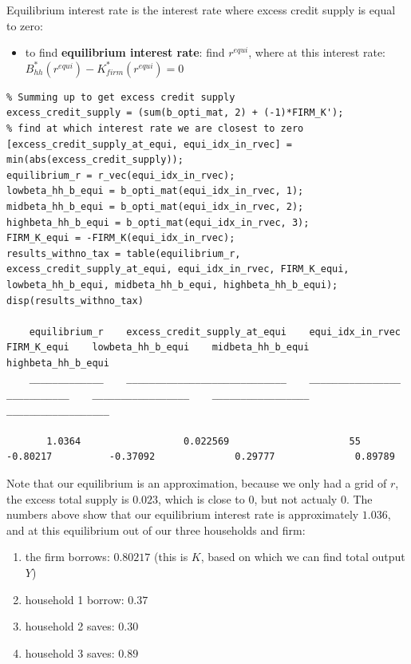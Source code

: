 \documentclass[
]{book}
\providecommand{\tightlist}{%
  \setlength{\itemsep}{0pt}\setlength{\parskip}{0pt}}
\begin{document}
Equilibrium interest rate is the interest rate where excess credit
supply is equal to zero:

\begin{itemize}
\tightlist
\item
  to find \textbf{equilibrium interest rate}: find \(r^{equi}\), where at
  this interest rate: \(B_{hh}^* (r^{equi} )-K_{firm}^* (r^{equi} )=0\)
\end{itemize}

\begin{verbatim}
% Summing up to get excess credit supply
excess_credit_supply = (sum(b_opti_mat, 2) + (-1)*FIRM_K');
% find at which interest rate we are closest to zero
[excess_credit_supply_at_equi, equi_idx_in_rvec] = min(abs(excess_credit_supply));
equilibrium_r = r_vec(equi_idx_in_rvec);
lowbeta_hh_b_equi = b_opti_mat(equi_idx_in_rvec, 1);
midbeta_hh_b_equi = b_opti_mat(equi_idx_in_rvec, 2);
highbeta_hh_b_equi = b_opti_mat(equi_idx_in_rvec, 3);
FIRM_K_equi = -FIRM_K(equi_idx_in_rvec);
results_withno_tax = table(equilibrium_r, excess_credit_supply_at_equi, equi_idx_in_rvec, FIRM_K_equi, lowbeta_hh_b_equi, midbeta_hh_b_equi, highbeta_hh_b_equi);
disp(results_withno_tax)

    equilibrium_r    excess_credit_supply_at_equi    equi_idx_in_rvec    FIRM_K_equi    lowbeta_hh_b_equi    midbeta_hh_b_equi    highbeta_hh_b_equi
    _____________    ____________________________    ________________    ___________    _________________    _________________    __________________

       1.0364                  0.022569                     55            -0.80217          -0.37092              0.29777              0.89789      
\end{verbatim}

Note that our equilibrium is an approximation, because we only had a
grid of \(r\), the excess total supply is \(0.023\), which is close to \(0\),
but not actualy \(0\). The numbers above show that our equilibrium
interest rate is approximately \(1.036\), and at this equilibrium out of
our three households and firm:

\begin{enumerate}
\def\labelenumi{\arabic{enumi}.}
\item
  the firm borrows: \(0.80217\) (this is \(K\), based on which we can find
  total output \(Y\))
\item
  household 1 borrow: \(0.37\)
\item
  household 2 saves: \(0.30\)
\item
  household 3 saves: \(0.89\)
\end{enumerate}
\end{document}
